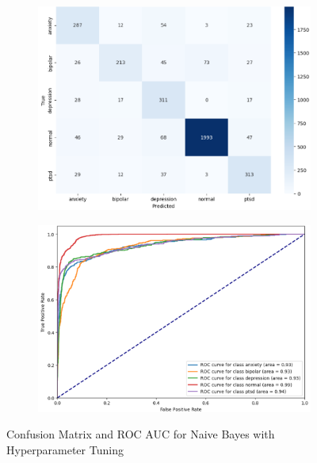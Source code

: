 \begin{figure}[h!]
    \centering
    \begin{subfigure}[b]{0.49\textwidth}
        \centering
        \includegraphics[width=\textwidth]{Images/HP NB CM.png}
        \label{LSTMROC7}  %
    \end{subfigure}
    \hfill
    \begin{subfigure}[b]{0.49\textwidth}
        \centering
        \includegraphics[width=\textwidth]{Images/HP NB ROC.png}
        \label{LSTMROC8}  %
    \end{subfigure}
    \vspace{-1.5em}
    \caption*{Confusion Matrix and ROC AUC for Naive Bayes with Hyperparameter Tuning}
    \label{fig:hp_nb_comparison}
\end{figure}


